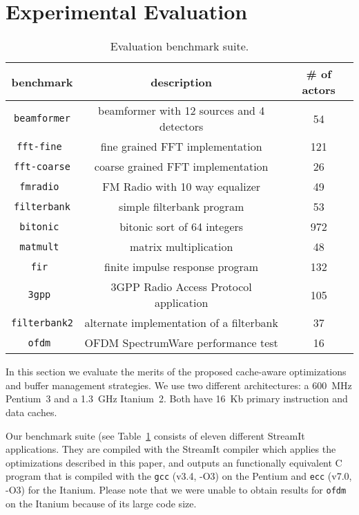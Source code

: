 \section{Experimental Evaluation}
\label{sec:evaluation}

\begin{table}[t]
\center
\label{tab:benchmarks}
\vspace{-12pt}
{\tiny
\begin{tabular}{|c|c|c|} \hline
{\bf benchmark}&{\bf description}&{\bf \# of actors}\\ \hline \hline
\texttt{beamformer} &beamformer with 12 sources and 4 detectors& 54 \\ \hline
\texttt{fft-fine	} &fine grained FFT implementation	&	121 \\ \hline
\texttt{fft-coarse} &coarse grained FFT implementation	&	26 \\ \hline
\texttt{fmradio	} &FM Radio with 10 way equalizer	&	49 \\ \hline
\texttt{filterbank} &simple filterbank program	&	53 \\ \hline
\texttt{bitonic	} &bitonic sort of 64 integers	&	972 \\ \hline
\texttt{matmult	} &matrix multiplication	&	48 \\ \hline
\texttt{fir	      } &finite impulse response program	&	132 \\ \hline
\texttt{3gpp	} &3GPP Radio Access Protocol application	&	105 \\ \hline
\texttt{filterbank2}&alternate implementation of a filterbank &	37 \\ \hline
\texttt{ofdm	 }&OFDM SpectrumWare performance test	&	16 \\ \hline
\end{tabular}
}
\vspace{-12pt}
\caption{Evaluation benchmark suite.}
\end{table}


In this section we evaluate the merits of the proposed cache-aware
optimizations and buffer management strategies. We use two
different architectures: a 600~MHz Pentium~3 and a 1.3~GHz
Itanium~2. Both have 16~Kb primary instruction and data caches.

Our benchmark suite (see Table~\ref{tab:benchmarks} consists of eleven
different StreamIt applications. They are compiled with the StreamIt
compiler which applies the optimizations described in this paper, and
outputs an functionally equivalent C program that is compiled with the
\texttt{gcc} (v3.4, -O3) on the Pentium and \texttt{ecc} 
(v7.0, -O3) for the Itanium. Please note that we were unable 
to obtain results for \texttt{ofdm} on the Itanium because of its 
large code size.

